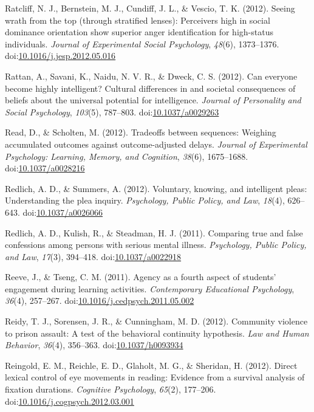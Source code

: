 \documentclass[english,man]{apa6}
\theoremstyle{definition}
\theoremstyle{definition}
\theoremstyle{definition}
\theoremstyle{remark}
\begin{document}
\hypertarget{ref-Ratcliff2012}{}
Ratcliff, N. J., Bernstein, M. J., Cundiff, J. L., \& Vescio, T. K.
(2012). Seeing wrath from the top (through stratified lenses):
Perceivers high in social dominance orientation show superior anger
identification for high-status individuals. \emph{Journal of
Experimental Social Psychology}, \emph{48}(6), 1373--1376.
doi:\href{https://doi.org/10.1016/j.jesp.2012.05.016}{10.1016/j.jesp.2012.05.016}

\hypertarget{ref-Rattan2012}{}
Rattan, A., Savani, K., Naidu, N. V. R., \& Dweck, C. S. (2012). Can
everyone become highly intelligent? Cultural differences in and societal
consequences of beliefs about the universal potential for intelligence.
\emph{Journal of Personality and Social Psychology}, \emph{103}(5),
787--803. doi:\href{https://doi.org/10.1037/a0029263}{10.1037/a0029263}

\hypertarget{ref-Read2012}{}
Read, D., \& Scholten, M. (2012). Tradeoffs between sequences: Weighing
accumulated outcomes against outcome-adjusted delays. \emph{Journal of
Experimental Psychology: Learning, Memory, and Cognition}, \emph{38}(6),
1675--1688.
doi:\href{https://doi.org/10.1037/a0028216}{10.1037/a0028216}

\hypertarget{ref-Redlich2012}{}
Redlich, A. D., \& Summers, A. (2012). Voluntary, knowing, and
intelligent pleas: Understanding the plea inquiry. \emph{Psychology,
Public Policy, and Law}, \emph{18}(4), 626--643.
doi:\href{https://doi.org/10.1037/a0026066}{10.1037/a0026066}

\hypertarget{ref-Redlich2011}{}
Redlich, A. D., Kulish, R., \& Steadman, H. J. (2011). Comparing true
and false confessions among persons with serious mental illness.
\emph{Psychology, Public Policy, and Law}, \emph{17}(3), 394--418.
doi:\href{https://doi.org/10.1037/a0022918}{10.1037/a0022918}

\hypertarget{ref-Reeve2011}{}
Reeve, J., \& Tseng, C. M. (2011). Agency as a fourth aspect of
students' engagement during learning activities. \emph{Contemporary
Educational Psychology}, \emph{36}(4), 257--267.
doi:\href{https://doi.org/10.1016/j.cedpsych.2011.05.002}{10.1016/j.cedpsych.2011.05.002}

\hypertarget{ref-Reidy2012}{}
Reidy, T. J., Sorensen, J. R., \& Cunningham, M. D. (2012). Community
violence to prison assault: A test of the behavioral continuity
hypothesis. \emph{Law and Human Behavior}, \emph{36}(4), 356--363.
doi:\href{https://doi.org/10.1037/h0093934}{10.1037/h0093934}

\hypertarget{ref-Reingold2012}{}
Reingold, E. M., Reichle, E. D., Glaholt, M. G., \& Sheridan, H. (2012).
Direct lexical control of eye movements in reading: Evidence from a
survival analysis of fixation durations. \emph{Cognitive Psychology},
\emph{65}(2), 177--206.
doi:\href{https://doi.org/10.1016/j.cogpsych.2012.03.001}{10.1016/j.cogpsych.2012.03.001}
\end{document}
